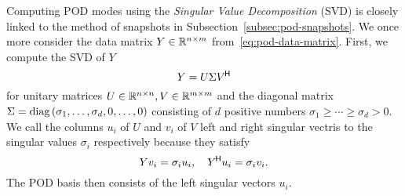 Computing POD modes using the \emph{Singular Value Decomposition} (SVD) is closely linked to the method of snapshots in Subsection~\ref{subsec:pod-snapshots}.
We once more consider the data matrix $Y \in \mathbb{R}^{n \times m}$ from~\eqref{eq:pod-data-matrix}.
First, we compute the SVD of $Y$
\begin{equation*}
    Y = U \Sigma V^{\mkern-1.5mu \mathsf{H}}
\end{equation*}
for unitary matrices $U \in \mathbb{R}^{n \times n}, V \in \mathbb{R}^{m \times m}$ and the diagonal matrix $\Sigma = \mathop{}\!\mathrm{diag}\left(\sigma_1, \dots, \sigma_d, 0, \dots, 0\right)$ consisting of $d$ positive numbers $\sigma_1 \geq \cdots \geq \sigma_d > 0$.
We call the columns $u_i$ of $U$ and $v_i$ of $V$ left and right singular vectris to the singular values $\sigma_i$ respectively because they satisfy
\begin{equation*}
    Y v_i = \sigma_i u_i,\quad Y^{\mkern-1.5mu \mathsf{H}} u_i = \sigma_i v_i.
\end{equation*}
The POD basis then consists of the left singular vectors $u_i$.


